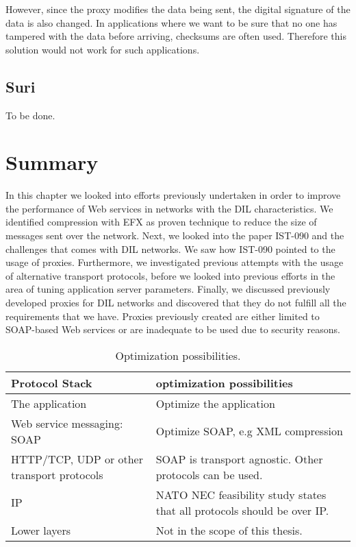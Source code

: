  However, since the proxy modifies the data being sent, the digital signature of
 the data is also changed. In applications where we want to be sure that no one
 has tampered with the data before arriving, checksums are often used. Therefore
 this solution would not work for such applications.


\subsection{Suri}
To be done.



\section{Summary}

In this chapter we looked into efforts previously undertaken in order to improve
the performance of Web services in networks with the DIL characteristics. We
identified compression with EFX as proven technique to reduce the size of
messages sent over the network. Next, we looked into the paper IST-090 and the
challenges that comes with DIL networks. We saw how IST-090 pointed to the usage
of proxies. Furthermore, we investigated previous attempts with the usage of
alternative transport protocols, before we looked into previous efforts in the
area of tuning application server parameters. Finally, we discussed previously
developed proxies for DIL networks and discovered that they do not fulfill all
the requirements that we have. Proxies previously created are either limited to
SOAP-based Web services or are inadequate to be used due to security reasons.

\begin{table}[h]
\begin{tabularx}{\textwidth}{| X | X |}
\hline
  \textbf{Protocol Stack} & \textbf{optimization possibilities} \\ \hline
  The application & Optimize the application\\ \hline
  Web service messaging: SOAP & Optimize SOAP, e.g XML compression \\ \hline
  HTTP/TCP, UDP or other transport protocols & SOAP is transport agnostic. Other
  protocols can be used. \\ \hline
  IP & NATO NEC feasibility study states that all protocols should be over IP. \\
  \hline
  Lower layers & Not in the scope of this thesis. \\ \hline
\end{tabularx}
\caption{Optimization possibilities.} \label{table:optimalization-overview}
\end{table}
